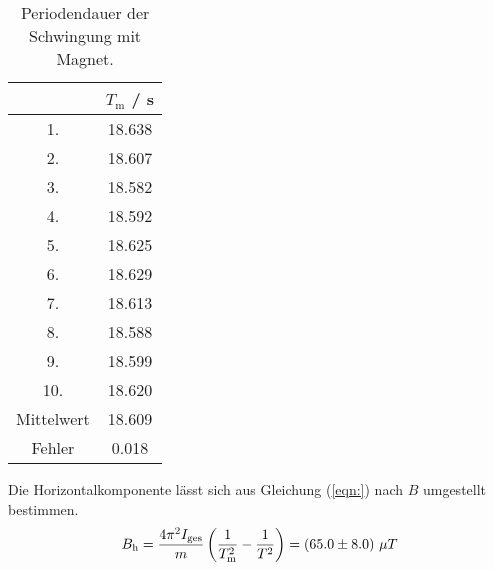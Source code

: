 \begin{table}[H] %
  \centering
  \begin{tabular}{c c}
    \toprule
    & $T_\text{m}$ / s \\
    \midrule
    1. & 18.638 \\
    2. & 18.607 \\
    3. & 18.582 \\
    4. & 18.592 \\
    5. & 18.625 \\
    6. & 18.629 \\
    7. & 18.613 \\
    8. & 18.588 \\
    9. & 18.599 \\
    10.& 18.620 \\
    \bottomrule
    Mittelwert & 18.609 \\
    Fehler & 0.018 \\
    \bottomrule
  \end{tabular}
  \caption{Periodendauer der Schwingung mit Magnet.}
  \label{tab:Periodendauer2}
\end{table}

Die Horizontalkomponente lässt sich aus Gleichung (\ref{eqn:}) nach $B$ umgestellt bestimmen.
\begin{equation}
  B_\text{h} = \frac{4 \pi^2 I_\text{ges}}{m} \left(\frac{1}{T_\text{m}^2} - \frac{1}{T^2} \right) = (\num{65.0 +- 8.0}) \ \mu T
\end{equation}
